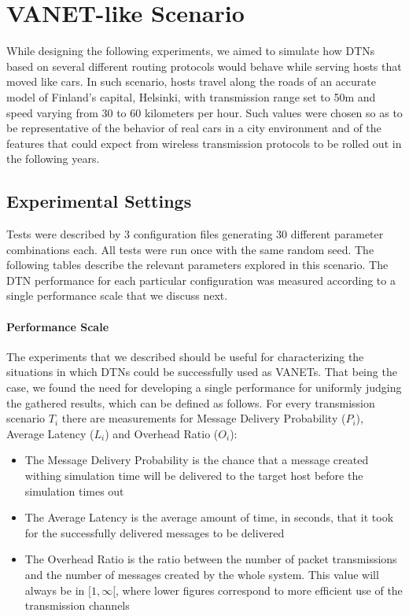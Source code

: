 \section{VANET-like Scenario}

While designing the following experiments, we aimed to simulate how DTNs based
on several different routing protocols would behave while serving hosts that
moved like cars. In such scenario, hosts travel along the roads of an accurate
model of Finland's capital, Helsinki, with transmission range set to 50m and
speed varying from 30 to 60 kilometers per hour. Such values were chosen so as
to be representative of the behavior of real cars in a city environment and of
the features that could expect from wireless transmission protocols to be
rolled out in the following years.

\subsection{Experimental Settings}

Tests were described by 3 configuration files generating 30 different parameter
combinations each.  All tests were run once with the same random seed.  The
following tables describe the relevant parameters explored in this scenario.
The DTN performance for each particular configuration was measured according to
a single performance scale that we discuss next.
\paragraph{Performance Scale}

The experiments that we described should be useful for characterizing the
situations in which DTNs could be successfully used as VANETs. That being the
case, we found the need for developing a single performance for uniformly
judging the gathered results, which can be defined as follows. For every
transmission scenario $T_i$ there are measurements for Message Delivery
Probability ($P_i$), Average Latency ($L_i$) and Overhead Ratio ($O_i$):

\begin{itemize}
    \item The Message Delivery Probability is the chance that a message
    created withing simulation time will be delivered to the target host
    before the simulation times out

    \item The Average Latency is the average amount of time, in seconds,
    that it took for the successfully delivered messages to be delivered

    \item The Overhead Ratio is the ratio between the number of packet
    transmissions and the number of messages created by the whole system.
    This value will always be in $[1, \infty[$, where lower figures correspond
    to more efficient use of the transmission channels
\end{itemize}

